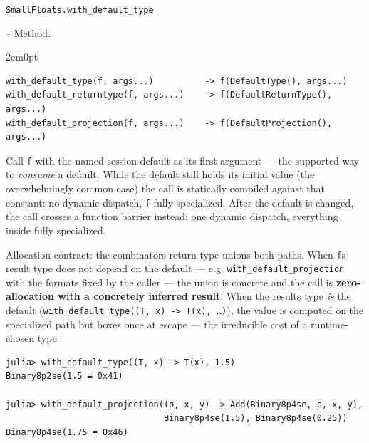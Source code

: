 \par\medskip\noindent\begin{minipage}{\linewidth}
\hypertarget{8589336690729975238}{\texttt{SmallFloats.with\_\allowbreak{}default\_\allowbreak{}type}}  -- {Method.}
\nopagebreak
\begin{adjustwidth}{2em}{0pt}


\begin{verbatim}
with_default_type(f, args...)          -> f(DefaultType(), args...)
with_default_returntype(f, args...)    -> f(DefaultReturnType(), args...)
with_default_projection(f, args...)    -> f(DefaultProjection(), args...)
\end{verbatim}

Call \texttt{f} with the named session default as its first argument — the supported way to \emph{consume} a default. While the default still holds its initial value (the overwhelmingly common case) the call is statically compiled against that constant: no dynamic dispatch, \texttt{f} fully specialized. After the default is changed, the call crosses a function barrier instead: one dynamic dispatch, everything inside fully specialized.

Allocation contract: the combinator{\textquotesingle}s return type unions both paths. When \texttt{f}{\textquotesingle}s result type does not depend on the default — e.g. \texttt{with\_\allowbreak{}default\_\allowbreak{}projection} with the formats fixed by the caller — the union is concrete and the call is \textbf{zero-allocation with a concretely inferred result}. When the result{\textquotesingle}s type \emph{is} the default (\texttt{with\_\allowbreak{}default\_\allowbreak{}type(\allowbreak{}(\allowbreak{}T, x) -> T(\allowbreak{}x), …)}), the value is computed on the specialized path but boxes once at escape — the irreducible cost of a runtime-chosen type.


\begin{verbatim}
julia> with_default_type((T, x) -> T(x), 1.5)
Binary8p2se(1.5 ≡ 0x41)

julia> with_default_projection((ρ, x, y) -> Add(Binary8p4se, ρ, x, y),
                               Binary8p4se(1.5), Binary8p4se(0.25))
Binary8p4se(1.75 ≡ 0x46)
\end{verbatim}



\end{adjustwidth}
\end{minipage}
\par\medskip


